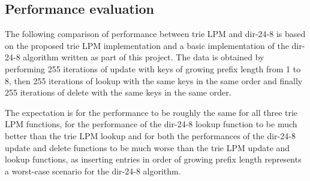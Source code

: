 \documentclass{article}
\begin{document}
\subsection{Performance evaluation}
The following comparison of performance between trie LPM and dir-24-8 is based on
the proposed trie LPM implementation and a basic implementation of the dir-24-8
algorithm written as part of this project. The data is obtained by performing 255
iterations of update with keys of growing prefix length from 1 to 8, then 255
iterations of lookup with the same keys in the same order and finally 255 iterations
of delete with the same keys in the same order. \par
The expectation is for the performance to be roughly the same for all three trie
LPM functions, for the performance of the dir-24-8 lookup function to be much better
than the trie LPM lookup and for both the performances of the dir-24-8 update
and delete functions to be much worse than the trie LPM update and lookup functions,
as inserting entries in order of growing prefix length represents a worst-case
scenario for the dir-24-8 algorithm. \par
\end{document}
